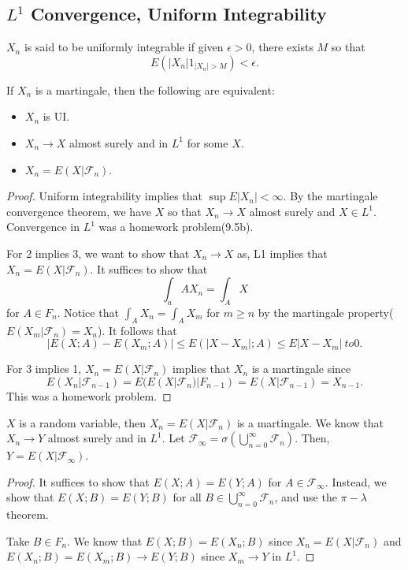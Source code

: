 \documentclass[11pt]{scrartcl}
\let \mc \mathcal
\begin{document}
\subsection{$L^1$ Convergence, Uniform Integrability}
\begin{definition} $X_n$ is said to be uniformly integrable if given $\epsilon > 0$, there exists $M$ so that 
$$E(|X_n|1_{|X_n| > M}) < \epsilon.$$
\end{definition}
\begin{thm} If $X_n$ is a martingale, then the following are equivalent:
\begin{itemize}
\item $X_n$ is UI.
\item $X_n \to X$ almost surely and in $L^1$ for some $X$.
\item $X_n = E(X|\mc F_n)$.
\end{itemize}
\end{thm}
\begin{proof}
Uniform integrability implies that $\sup E|X_n| < \infty$.  By the martingale convergence theorem, we have $X$ so that $X_n \to X$ almost surely and $X \in L^1$.  Convergence in $L^1$ was a homework problem(9.5b).  

For 2 implies 3, we want to show that $X_n \to X$ as, L1 implies that $X_n = E(X|\mc F_n)$.  It suffices to show that 
$$\int_aA X_n = \int_A X$$
for $A \in F_n$.  Notice that $\int_A X_n = \int_A X_m$ for $m \ge n$ by the martingale property($E(X_m | \mc F_n) = X_n$).  It follows that $$|E(X; A) - E(X_m; A)| \le E(|X - X_m|; A) \le E|X - X_m| \ to 0.$$

For 3 implies 1, $X_n = E(X|\mc F_n)$ implies that $X_n$ is a martingale since 
$$E(X_n|\mc F_{n-1}) = E(E(X|\mc F_n) | F_{n-1}) = E(X|\mc F_{n-1}) = X_{n-1}.$$
This was a homework problem.
\end{proof}
\begin{corollary} $X$ is a random variable, then $X_n = E(X|\mc F_n)$ is a martingale.  We know that $X_n \to Y$ almost surely and in $L^1$.  Let $\mc F_\infty = \sigma(\bigcup_{n=0}^{\infty} \mc F_n)$.  Then, $Y = E(X|\mc F_\infty)$.
\end{corollary}
\begin{proof}
It suffices to show that $E(X; A) = E(Y; A)$ for $A \in \mc F_\infty$.  Instead, we show that $E(X; B) = E(Y; B)$ for all $B \in \bigcup_{n=0}^{\infty} \mc F_n$, and use the $\pi-\lambda$ theorem.

Take $B \in F_n$. We know that $E(X; B) = E(X_n; B)$ since $X_n = E(X|\mc F_n)$ and $E(X_n ; B) = E(X_m ; B) \to E(Y ; B)$ since $X_m \to Y$ in $L^1$.  
\end{proof}
\end{document}
